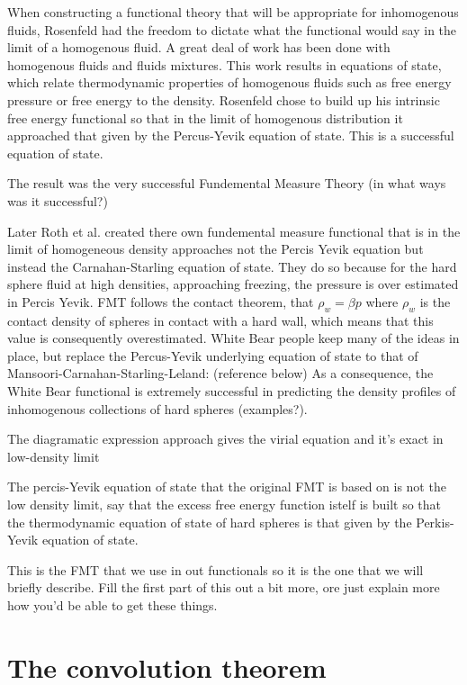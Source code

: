 When constructing a functional theory that will be appropriate for
inhomogenous fluids, Rosenfeld had the freedom to dictate what the
functional would say in the limit of a homogenous fluid.  A great deal
of work has been done with homogenous fluids and fluids mixtures.
This work results in equations of state, which relate thermodynamic
properties of homogenous fluids such as free energy pressure or free
energy to the density.  Rosenfeld chose to build up his intrinsic free
energy functional so that in the limit of homogenous distribution it
approached that given by the Percus-Yevik equation of state.  This is
a successful equation of state.

The result was the very successful Fundemental Measure Theory (in what
ways was it successful?)

Later Roth et al. created there own fundemental measure functional
that is in the limit of homogeneous density approaches not the Percis
Yevik equation but instead the Carnahan-Starling equation of state.
They do so because for the hard sphere fluid at high densities,
approaching freezing, the pressure is over estimated in Percis Yevik.
FMT follows the contact theorem, that $\rho_w= \beta p$ where $\rho_w$
is the contact density of spheres in contact with a hard wall, which
means that this value is consequently overestimated.  White Bear
people keep many of the ideas in place, but replace the Percus-Yevik
underlying equation of state to that of
Mansoori-Carnahan-Starling-Leland: (reference below) As a consequence,
the White Bear functional is extremely successful in predicting the
density profiles of inhomogenous collections of hard spheres
(examples?).

The diagramatic expression approach gives the virial equation and it's
exact in low-density limit


The percis-Yevik equation of state that the original FMT is based on
is not the low density limit, say that the excess free energy function
istelf is built so that the thermodynamic equation of state of hard
spheres is that given by the Perkis-Yevik equation of state.

This is the FMT that we use in out functionals so it is the one that
we will briefly describe.  Fill the first part of this out a bit more,
ore just explain more how you'd be able to get these things.

\section{The convolution theorem}

